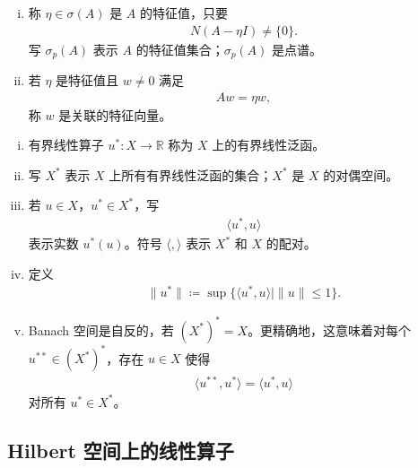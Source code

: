 \documentclass[../main.tex]{subfiles}
\begin{document}
\begin{definition}\label{definition:appD-特征值}
\begin{enumerate}[(i)]
\item 称 $\eta\in\sigma(A)$ 是 $A$ 的特征值，只要
\begin{align*}
N(A-\eta I)\neq\{0\}.
\end{align*}
写 $\sigma_p(A)$ 表示 $A$ 的特征值集合；$\sigma_p(A)$ 是点谱。

\item 若 $\eta$ 是特征值且 $w\neq 0$ 满足
\begin{align*}
Aw=\eta w,
\end{align*}
称 $w$ 是关联的特征向量。
\end{enumerate}
\end{definition}

\begin{definition}\label{definition:appD-对偶}
\begin{enumerate}[(i)]
\item 有界线性算子 $u^*:X\to\mathbb{R}$ 称为 $X$ 上的有界线性泛函。

\item 写 $X^*$ 表示 $X$ 上所有有界线性泛函的集合；$X^*$ 是 $X$ 的对偶空间。

\item 若 $u\in X$，$u^*\in X^*$，写
\begin{align*}
\langle u^*,u\rangle
\end{align*}
表示实数 $u^*(u)$。符号 $\langle,\rangle$ 表示 $X^*$ 和 $X$ 的配对。

\item 定义
\begin{align*}
\|u^*\|\coloneqq\sup\{\langle u^*,u\rangle\mid\|u\|\leqslant 1\}.
\end{align*}

\item Banach 空间是自反的，若 $(X^*)^*=X$。更精确地，这意味着对每个 $u^{**}\in(X^*)^*$，存在 $u\in X$ 使得
\begin{align*}
\langle u^{**},u^*\rangle=\langle u^*,u\rangle
\end{align*}
对所有 $u^*\in X^*$。
\end{enumerate}
\end{definition}

\subsection{Hilbert 空间上的线性算子}\label{subsection:appD-Hilbert算子}
\end{document}
